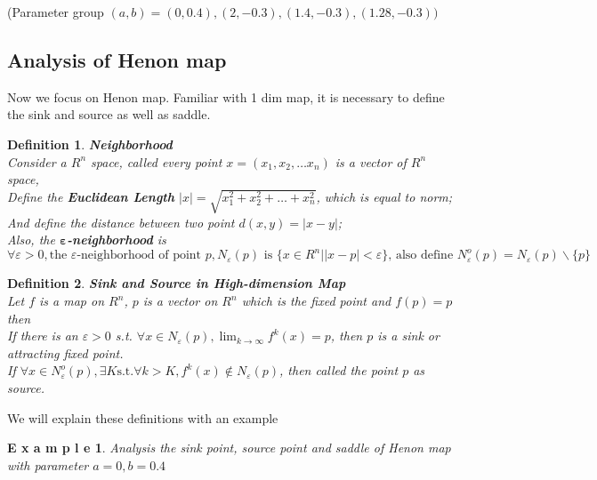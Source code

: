 \documentclass[12pt]{article}
\theoremstyle{plain}
\newtheorem{definition}{{\color{red}\textbf{Definition}}}[section]
\newtheorem{example}{\textbf{E x a m p l e}}[section]
\begin{document}
(Parameter group $(a, b) = (0, 0.4), (2, -0.3), (1.4, -0.3), (1.28, -0.3))$







\subsection{Analysis of Henon map}
Now we focus on Henon map. Familiar with 1 dim map, it is necessary to define the sink and source as well as saddle.

\begin{definition}\textbf{Neighborhood}
\\\noindent Consider a $R^n$ space, called every point $x = (x_1, x_2, \ldots x_n)$ is a vector of $R^n$ space,
\\\noindent Define the \textbf{Euclidean Length} $|x| = \sqrt{x_1^2 + x_2^2 + \ldots + x_n^2}$, which is equal to norm;
\\\noindent And define the distance between two point $d(x, y) = |x - y|$;
\\\noindent Also, the \textbf{$\mathbf{\varepsilon}$-neighborhood} is 
$$
\forall \varepsilon > 0, \text{the }\varepsilon \text{-neighborhood of point }p, N_\varepsilon(p) \text{ is } \{x\in R^n | |x - p| < \varepsilon\} \text{, also define }N_\varepsilon^o(p) = N_\varepsilon(p)\backslash\{p\}
$$
\end{definition}

\begin{definition}\textbf{Sink and Source in High-dimension Map}
\\\noindent Let $f$ is a map on $R^n$, $p$ is a vector on $R^n$ which is the fixed point and $f(p) = p$ then 
\\\noindent If there is an $\varepsilon > 0$ s.t. $\forall x \in N_\varepsilon(p), \lim_{k \rightarrow \infty}f^k(x) = p$, then $p$ is a sink or attracting fixed point.
\\\noindent If $\forall x \in N_\varepsilon^o(p), \exists K \text{s.t.} \forall k > K, f^k(x) \notin N_\varepsilon(p)$, then called the point $p$ as source.
\end{definition}


We will explain these definitions with an example


\begin{example} \label{Henon-map-0-0*4}Analysis the sink point, source point and saddle of Henon map with parameter $a = 0, b = 0.4$
\end{example}
\end{document}
